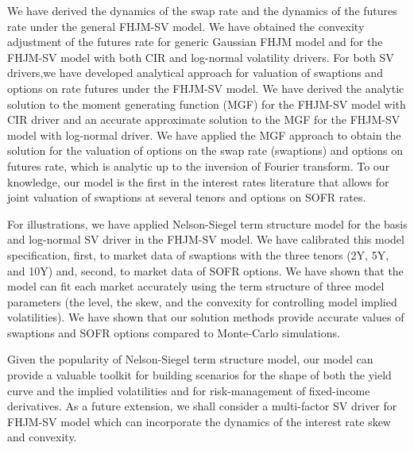 \documentclass[pdftex,11pt,a4paper] {article}
\begin{document}
We have derived the dynamics of the swap rate and the dynamics of the futures rate under the general FHJM-SV model. We have obtained the convexity adjustment of the futures rate for generic Gaussian FHJM model and for the FHJM-SV model with both CIR and log-normal volatility drivers. For both SV drivers,we have developed analytical approach for valuation of swaptions and options on rate futures under the FHJM-SV model. We have derived the analytic solution to the moment generating function (MGF) for the FHJM-SV model with CIR driver and an accurate approximate solution to the MGF for the FHJM-SV model with log-normal driver. We have applied the MGF approach to obtain the solution for the valuation of options on the swap rate (swaptions) and options on futures rate, which is analytic up to the inversion of Fourier transform. To our knowledge, our model is the first in the interest rates literature that allows for joint valuation of swaptions at several tenors and options on SOFR rates.


For illustrations, we have applied Nelson-Siegel term structure model for the basis and log-normal SV driver in the FHJM-SV model. We have calibrated this model specification, first, to market data of swaptions with the three tenors (2Y, 5Y, and 10Y) and, second, to market data of SOFR options. We have shown that the model can fit each market accurately using the term structure of three model parameters (the level, the skew, and the convexity for controlling model implied volatilities). We have shown that our solution methods provide accurate values of swaptions and SOFR options compared to Monte-Carlo simulations.

Given the popularity of Nelson-Siegel term structure model, our model can provide a valuable toolkit for building scenarios for the shape of both the yield curve and the implied volatilities and for risk-management of fixed-income derivatives. As a future extension, we shall consider a multi-factor SV driver for FHJM-SV model which can incorporate the dynamics of the interest rate skew and convexity.

\printendnotes
\end{document}
